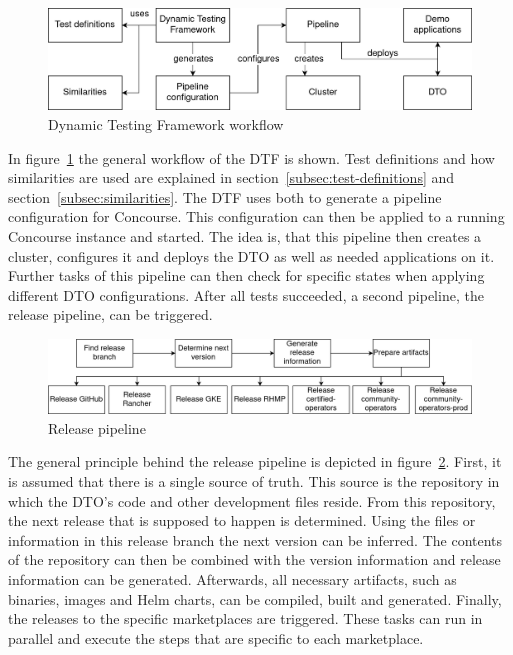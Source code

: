 \begin{figure}[H]
    \centering
    \includegraphics[width=\textwidth]{img/context/dtf}
    \caption{Dynamic Testing Framework workflow}
    \label{fig:dtf-workflow}
\end{figure}

In figure~\ref{fig:dtf-workflow} the general workflow of the DTF is shown.
Test definitions and how similarities are used are explained in section~\ref{subsec:test-definitions} and section~\ref{subsec:similarities}.
The DTF uses both to generate a pipeline configuration for Concourse.
This configuration can then be applied to a running Concourse instance and started.
The idea is, that this pipeline then creates a cluster, configures it and deploys the DTO as well as needed applications on it.
Further tasks of this pipeline can then check for specific states when applying different DTO configurations.
After all tests succeeded, a second pipeline, the release pipeline, can be triggered.

\begin{figure}[H]
    \centering
    \includegraphics[width=\textwidth]{img/context/release pipeline}
    \caption{Release pipeline}
    \label{fig:release-pipeline}
\end{figure}

The general principle behind the release pipeline is depicted in figure~\ref{fig:release-pipeline}.
First, it is assumed that there is a single source of truth.
This source is the repository in which the DTO's code and other development files reside.
From this repository, the next release that is supposed to happen is determined.
Using the files or information in this release branch the next version can be inferred.
The contents of the repository can then be combined with the version information and release information can be generated.
Afterwards, all necessary artifacts, such as binaries, images and Helm charts, can be compiled, built and generated.
Finally, the releases to the specific marketplaces are triggered.
These tasks can run in parallel and execute the steps that are specific to each marketplace.

